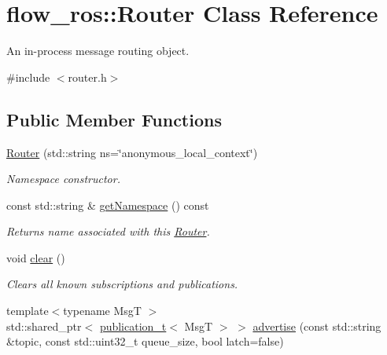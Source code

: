 \hypertarget{classflow__ros_1_1_router}{}\section{flow\+\_\+ros\+:\+:Router Class Reference}
\label{classflow__ros_1_1_router}


An in-\/process message routing object.  




{\ttfamily \#include $<$router.\+h$>$}

\subsection*{Public Member Functions}
\begin{DoxyCompactItemize}
\item 
\hyperlink{classflow__ros_1_1_router_a90b7c5099932b00dee22ed58c99644a0}{Router} (std\+::string ns=\char`\"{}anonymous\+\_\+local\+\_\+context\char`\"{})
\begin{DoxyCompactList}\small\item\em Namespace constructor. \end{DoxyCompactList}\item 
\mbox{\label{classflow__ros_1_1_router_a8192fca645e648bba809fc1975fbe261}} 
const std\+::string \& \hyperlink{classflow__ros_1_1_router_a8192fca645e648bba809fc1975fbe261}{get\+Namespace} () const
\begin{DoxyCompactList}\small\item\em Returns name associated with this \hyperlink{classflow__ros_1_1_router}{Router}. \end{DoxyCompactList}\item 
\mbox{\label{classflow__ros_1_1_router_a53f2dc6ff8226ac8cf60af80123596db}} 
void \hyperlink{classflow__ros_1_1_router_a53f2dc6ff8226ac8cf60af80123596db}{clear} ()
\begin{DoxyCompactList}\small\item\em Clears all known subscriptions and publications. \end{DoxyCompactList}\item 
{\footnotesize template$<$typename MsgT $>$ }\\std\+::shared\+\_\+ptr$<$ \hyperlink{classflow__ros_1_1routing_1_1_local_publication}{publication\+\_\+t}$<$ MsgT $>$ $>$ \hyperlink{classflow__ros_1_1_router_a9063ea60d71047f372d7321f36629ca4}{advertise} (const std\+::string \&topic, const std\+::uint32\+\_\+t queue\+\_\+size, bool latch=false)

\end{DoxyCompactItemize}
